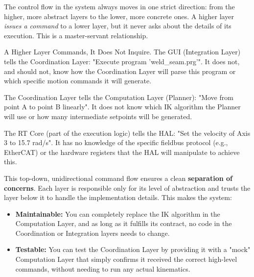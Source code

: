 The control flow in the system always moves in one strict direction: from the higher, more abstract layers to the lower, more concrete ones. A higher layer \textit{issues a command} to a lower layer, but it never asks about the details of its execution. This is a master-servant relationship.

\begin{principlebox}{A Higher Layer Commands, It Does Not Inquire.}
The GUI (Integration Layer) tells the Coordination Layer: "Execute program 'weld\_seam.prg'". It does not, and should not, know how the Coordination Layer will parse this program or which specific motion commands it will generate.
    
The Coordination Layer tells the Computation Layer (Planner): "Move from point A to point B linearly". It does not know which IK algorithm the Planner will use or how many intermediate setpoints will be generated.
    
The RT Core (part of the execution logic) tells the HAL: "Set the velocity of Axis 3 to 15.7 rad/s". It has no knowledge of the specific fieldbus protocol (e.g., EtherCAT) or the hardware registers that the HAL will manipulate to achieve this.
\end{principlebox}

This top-down, unidirectional command flow ensures a clean \textbf{separation of concerns}. Each layer is responsible only for its level of abstraction and trusts the layer below it to handle the implementation details. This makes the system:
\begin{itemize}
    \item \textbf{Maintainable:} You can completely replace the IK algorithm in the Computation Layer, and as long as it fulfills its contract, no code in the Coordination or Integration layers needs to change.
    \item \textbf{Testable:} You can test the Coordination Layer by providing it with a "mock" Computation Layer that simply confirms it received the correct high-level commands, without needing to run any actual kinematics.
\end{itemize}

